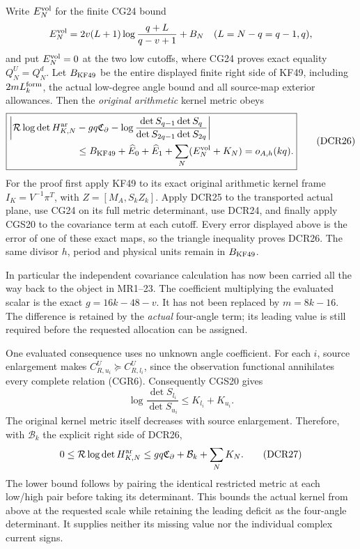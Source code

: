 \documentclass[11pt]{article}
\begin{document}
Write \(E_N^{\rm vol}\) for the finite CG24 bound
\[
E_N^{\rm vol}
 =2v(L+1)\log\frac{q+L}{q-v+1}+B_N
 \quad(L=N-q=q-1,q),
\]
and put \(E_N^{\rm vol}=0\) at the two low cutoffs, where CG24
proves exact equality \(Q_N^U=Q_N^d\).
Let \(B_{\rm KF49}\) be the entire displayed finite right side
of KF49, including \(2mL_k^{\rm form}\), the actual low-degree
angle bound and all source-map exterior allowances.
Then the \emph{original arithmetic} kernel metric obeys
\[
\boxed{
\begin{aligned}
\bigg|\mathcal R\log\det H_{K,N}^{\rm ar}
 &-gq\mathfrak C_\partial
 -\log\frac{\det S_{q-1}\det S_q}
                 {\det S_{2q-1}\det S_{2q}}\bigg|\\
&\le B_{\rm KF49}+\widehat E_0+\widehat E_1+
       \sum_N(E_N^{\rm vol}+K_N)
   =o_{A,h}(kq).
\end{aligned}}
\tag{DCR26}
\]
For the proof first apply KF49 to its exact original arithmetic
kernel frame \(I_K=V^{-1}\pi^T\), with
\(Z=[M_A,S_kZ_k]\). Apply DCR25 to the transported actual plane,
use CG24 on its full metric determinant, use DCR24, and finally
apply CGS20 to the covariance term at each cutoff.
Every error displayed above is the error of one of these exact
maps, so the triangle inequality proves DCR26. The same divisor
\(h\), period and physical units remain in \(B_{\rm KF49}\).

In particular the independent covariance calculation has now been
carried all the way back to the object in MR1--23. The coefficient
multiplying the evaluated scalar is the exact
\(g=16k-48-v\). It has not been replaced by \(m=8k-16\).
The difference is retained by the \emph{actual} four-angle term;
its leading value is still required before the requested allocation
can be assigned.

One evaluated consequence uses no unknown angle coefficient.
For each \(i\), source enlargement makes
\(C_{R,u_i}^U\succeq C_{R,l_i}^U\), since the observation functional
annihilates every complete relation (CGR6).
Consequently CGS20 gives
\[
\log\frac{\det S_{l_i}}{\det S_{u_i}}\le K_{l_i}+K_{u_i}.
\]
The original kernel metric itself decreases with source enlargement.
Therefore, with \(\mathcal B_k\) the explicit right side of DCR26,
\[
0\le\mathcal R\log\det H_{K,N}^{\rm ar}
\le gq\mathfrak C_\partial+\mathcal B_k+\sum_NK_N .
\tag{DCR27}
\]
The lower bound follows by pairing the identical restricted metric
at each low/high pair before taking its determinant. This bounds
the actual kernel from above at the requested scale while retaining
the leading deficit as the four-angle determinant. It supplies
neither its missing value nor the individual complex current signs.
\end{document}
